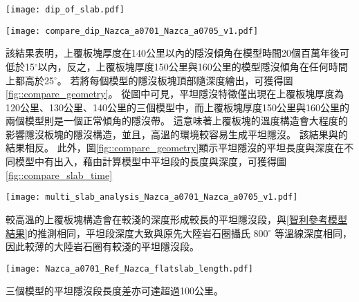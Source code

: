 \begin{figure*}[h]
    \centering
    \texttt{[image: dip\_of\_slab.pdf]}
    \caption[本研究中隱沒傾角的計算方式]{本研究中隱沒傾角的計算方式。}
    \label{fig::dip_of_slab}
\end{figure*}

\begin{figure*}[h]
    \centering
    \texttt{[image: compare\_dip\_Nazca\_a0701\_Nazca\_a0705\_v1.pdf]}
    \caption[不同上覆板塊厚度模型之隱沒傾角隨時間變化]{不同上覆板塊厚度模型之隱沒傾角隨時間變化。}
    \label{fig::compare_dip_thermal}
\end{figure*}

該結果表明，上覆板塊厚度在140公里以內的隱沒傾角在模型時間20個百萬年後可低於15$^\circ$以內，反之，上覆板塊厚度150公里與160公里的模型隱沒傾角在任何時間上都高於25$^\circ$。
若將每個模型的隱沒板塊頂部隨深度繪出，可獲得圖\ref{fig::compare_geometry}。
從圖中可見，平坦隱沒特徵僅出現在上覆板塊厚度為120公里、130公里、140公里的三個模型中，而上覆板塊厚度150公里與160公里的兩個模型則是一個正常傾角的隱沒帶。
這意味著上覆板塊的溫度構造會大程度的影響隱沒板塊的隱沒構造，並且，高溫的環境較容易生成平坦隱沒。
該結果與\citealp{Thermal2012}的結果相反。
此外，圖\ref{fig::compare_geometry}顯示平坦隱沒的平坦長度與深度在不同模型中有出入，藉由計算模型中平坦段的長度與深度，可獲得圖\ref{fig::compare_slab_time}
\begin{figure*}[h]
    \centering
    \texttt{[image: multi\_slab\_analysis\_Nazca\_a0701\_Nazca\_a0705\_v1.pdf]}
    \caption[不同上覆板塊厚度模型在50個百萬年的隱沒板塊構造]{不同上覆板塊厚度模型在50個百萬年時隱沒板塊於150公里以上之構造，幾何形狀取自隱沒板塊頂部，使用5公里移動平均平滑離散化的網格。}
    \label{fig::compare_geometry}
\end{figure*}

較高溫的上覆板塊構造會在較淺的深度形成較長的平坦隱沒段，與\ref{智利參考模型結果}的推測相同，平坦段深度大致與原先大陸岩石圈攝氏 800$^\circ$ 等溫線深度相同，因此較薄的大陸岩石圈有較淺的平坦隱沒段。
\begin{figure*}[h]
    \centering
    \texttt{[image: Nazca\_a0701\_Ref\_Nazca\_flatslab\_length.pdf]}
    \caption[不同上覆板塊厚度模型的平坦段長度與深度]{不同上覆板塊厚度模型的平坦段(a)長度與(b)深度。}
    \label{fig::compare_slab_time}
\end{figure*}

三個模型的平坦隱沒段長度差亦可達超過100公里。

